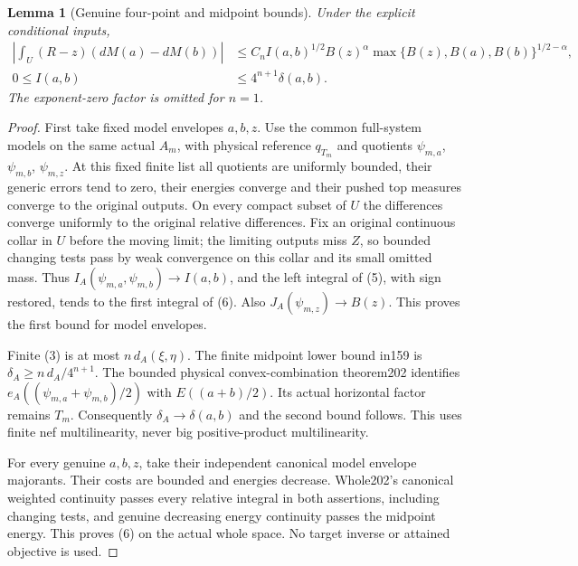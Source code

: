 \documentclass[11pt]{article}
\newtheorem{lemma}[theorem]{Lemma}
\begin{document}
\begin{lemma}[Genuine four-point and midpoint bounds]\label{genuine}
Under the explicit conditional inputs,
\[
\begin{split}
 \left|\int_U(R-z)(dM(a)-dM(b))\right|
 &\leq C_n I(a,b)^{1/2}B(z)^\alpha
              \max\{B(z),B(a),B(b)\}^{1/2-\alpha},\\
 0\leq I(a,b)&\leq4^{n+1}\delta(a,b).
\end{split}                                             \tag{6}
\]
The exponent-zero factor is omitted for $n=1$.
\end{lemma}
\begin{proof}
First take fixed model envelopes $a,b,z$.
Use the common full-system models on the same actual $A_m$,
with physical reference $q_{T_m}$ and quotients $\psi_{m,a}$,
$\psi_{m,b}$, $\psi_{m,z}$.
At this fixed finite list all quotients are uniformly bounded,
their generic errors tend to zero, their energies converge and
their pushed top measures converge to the original outputs.
On every compact subset of $U$ the differences converge uniformly
to the original relative differences.
Fix an original continuous collar in $U$ before the moving limit;
the limiting outputs miss $Z$, so bounded changing tests pass
by weak convergence on this collar and its small omitted mass.
Thus $I_A(\psi_{m,a},\psi_{m,b})\to I(a,b)$,
and the left integral of (5), with sign restored, tends to the
first integral of (6). Also $J_A(\psi_{m,z})\to B(z)$.
This proves the first bound for model envelopes.

Finite (3) is at most $n\,d_A(\xi,\eta)$.
The finite midpoint lower bound in159 is
$\delta_A\geq n\,d_A/4^{n+1}$.
The bounded physical convex-combination theorem202 identifies
$e_A((\psi_{m,a}+\psi_{m,b})/2)$ with $E((a+b)/2)$.
Its actual horizontal factor remains $T_m$.
Consequently $\delta_A\to\delta(a,b)$ and the second bound follows.
This uses finite nef multilinearity, never big positive-product
multilinearity.

For every genuine $a,b,z$, take their independent canonical model
envelope majorants. Their costs are bounded and energies decrease.
Whole202's canonical weighted continuity passes every relative
integral in both assertions, including changing tests, and genuine
decreasing energy continuity passes the midpoint energy.
This proves (6) on the actual whole space.
No target inverse or attained objective is used.
\end{proof}
\end{document}

